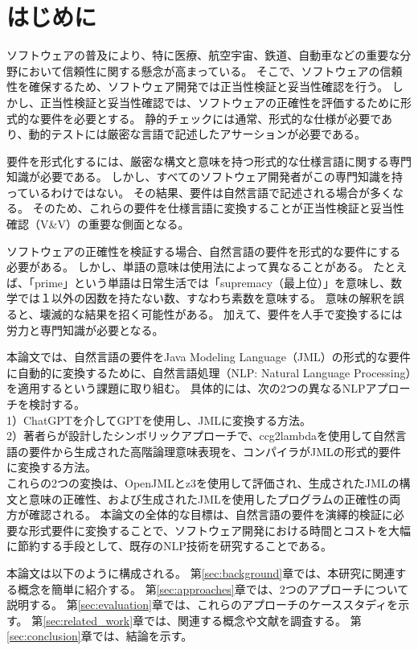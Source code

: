 \documentclass[uplatex, twocolumn,10pt]{jsarticle} %
\begin{document}
\section{はじめに} %
ソフトウェアの普及により、特に医療、航空宇宙、鉄道、自動車などの重要な分野において信頼性に関する懸念が高まっている。
そこで、ソフトウェアの信頼性を確保するため、ソフトウェア開発では正当性検証と妥当性確認を行う。
しかし、正当性検証と妥当性確認では、ソフトウェアの正確性を評価するために形式的な要件を必要とする。
静的チェックには通常、形式的な仕様が必要であり、動的テストには厳密な言語で記述したアサーションが必要である。

要件を形式化するには、厳密な構文と意味を持つ形式的な仕様言語に関する専門知識が必要である。
しかし、すべてのソフトウェア開発者がこの専門知識を持っているわけではない。
その結果、要件は自然言語で記述される場合が多くなる。
そのため、これらの要件を仕様言語に変換することが正当性検証と妥当性確認（V\&V）の重要な側面となる。

ソフトウェアの正確性を検証する場合、自然言語の要件を形式的な要件にする必要がある。
しかし、単語の意味は使用法によって異なることがある。
たとえば、「prime」という単語は日常生活では「supremacy（最上位）」を意味し、数学では１以外の因数を持たない数、すなわち素数を意味する。
意味の解釈を誤ると、壊滅的な結果を招く可能性がある。
加えて、要件を人手で変換するには労力と専門知識が必要となる。

本論文では、自然言語の要件をJava Modeling Language（JML）\cite{1}の形式的な要件に自動的に変換するために、自然言語処理（NLP: Natural Language Processing）を適用するという課題に取り組む。
具体的には、次の2つの異なるNLPアプローチを検討する。\\
1）ChatGPTを介してGPT\cite{2}を使用し、JMLに変換する方法。\\
2）著者らが設計したシンボリックアプローチで、ccg2lambda\cite{3}を使用して自然言語の要件から生成された高階論理意味表現を、コンパイラがJMLの形式的要件に変換する方法。\\
これらの2つの変換は、OpenJML\cite{4}とz3\cite{5}を使用して評価され、生成されたJMLの構文と意味の正確性、および生成されたJMLを使用したプログラムの正確性の両方が確認される。
本論文の全体的な目標は、自然言語の要件を演繹的検証に必要な形式要件に変換することで、ソフトウェア開発における時間とコストを大幅に節約する手段として、既存のNLP技術を研究することである。

本論文は以下のように構成される。
第\ref{sec:background}章では、本研究に関連する概念を簡単に紹介する。
第\ref{sec:approaches}章では、2つのアプローチについて説明する。
第\ref{sec:evaluation}章では、これらのアプローチのケーススタディを示す。
第\ref{sec:related_work}章では、関連する概念や文献を調査する。
第\ref{sec:conclusion}章では、結論を示す。
\end{document}
